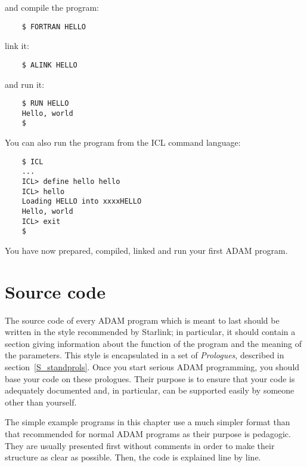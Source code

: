 and compile the program:

\begin{small}
\begin{verbatim}
    $ FORTRAN HELLO
\end{verbatim}
\end{small}

link it:

\begin{small}
\begin{verbatim}
    $ ALINK HELLO
\end{verbatim}
\end{small}

and run it:

\begin{small}
\begin{verbatim}
    $ RUN HELLO
    Hello, world
    $
\end{verbatim}
\end{small}

You can also run the program from the ICL command language:

\begin{small}
\begin{verbatim}
    $ ICL
    ...
    ICL> define hello hello
    ICL> hello
    Loading HELLO into xxxxHELLO
    Hello, world
    ICL> exit
    $
\end{verbatim}
\end{small}

You have now prepared, compiled, linked and run your first ADAM program.

\section{Source code}
\label{S_prog2}

The source code of every ADAM program which is meant to last should be written
in the style recommended by Starlink; in particular, it should contain a section
giving information about the function of the program and the meaning of the
parameters.
This style is encapsulated in a set of {\em Prologues}, described in
section~\ref{S_standprols}.
Once you start serious ADAM programming, you should base your code on these
prologues.
Their purpose is to ensure that your code is adequately documented and, in
particular, can be supported easily by someone other than yourself.

The simple example programs in this chapter use a much simpler format than that
recommended for normal ADAM programs as their purpose is pedagogic.
They are usually presented first without comments in order to make their
structure as clear as possible.
Then, the code is explained line by line.


